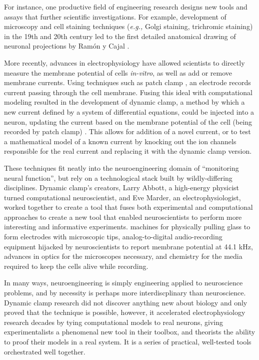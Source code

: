\documentclass[11pt]{diazessay} %
\begin{document}
For instance, one productive field of engineering research designs new tools and assays
that further scientific investigations.
For example, development of microscopy and cell staining techniques (\textit{e.g.,} Golgi staining, trichromic staining)
in the 19th and 20th century led to the first detailed anatomical drawing of neuronal projections
by Ram\'{o}n y Cajal \cite{SantiagoRamonCajal}.

More recently, advances in electrophysiology have allowed scientists to directly measure
the membrane potential of cells \textit{in-vitro}, as well as add or remove membrane currents.
Using techniques such as patch clamp \cite{neherPatchClampTechnique1992},
an electrode records current passing through the cell membrane.
Fusing this ideal with computational modeling resulted in the development of dynamic clamp,
a method by which a new current defined by a system of differential equations,
could be injected into a neuron, updating the current based on the membrane potential of the cell
(being recorded by patch clamp) \cite{prinzDynamicClampComes2004}.
This allows for addition of a novel current, or to test a mathematical model of a known current
by knocking out the ion channels responsible for the real current
and replacing it with the dynamic clamp version.

These techniques fit neatly into the neuroengineering domain of ``monitoring neural function'',
but rely on a technological stack built by wildly-differing disciplines.
Dynamic clamp's creators, Larry Abbott, a high-energy physicist turned computational neuroscientist,
and Eve Marder, an electrophysiologist, worked together to create a tool that fuses both experimental
and computational approaches to create a new tool that enabled neuroscientists to perform more interesting
and informative experiments.
machines for physically pulling glass to form electrodes with microscopic tips,
analog-to-digital audio-recording equipment hijacked by neuroscientists to report
membrane potential at 44.1 kHz, advances in optics for the microscopes necessary,
and chemistry for the media required to keep the cells alive while recording.

In many ways, neuroengineering is simply engineering applied to neuroscience problems,
and by necessity is perhaps more interdiscplinary than neuroscience.
Dynamic clamp research did not discover anything new about biology and only proved that the technique is possible,
however, it accelerated electrophysiology research decades
by tying computational models to real neurons,
giving experimentalists a phenomenal new tool in their toolbox,
and theorists the ability to proof their models in a real system.
It is a series of practical, well-tested tools orchestrated well together.
\end{document}
